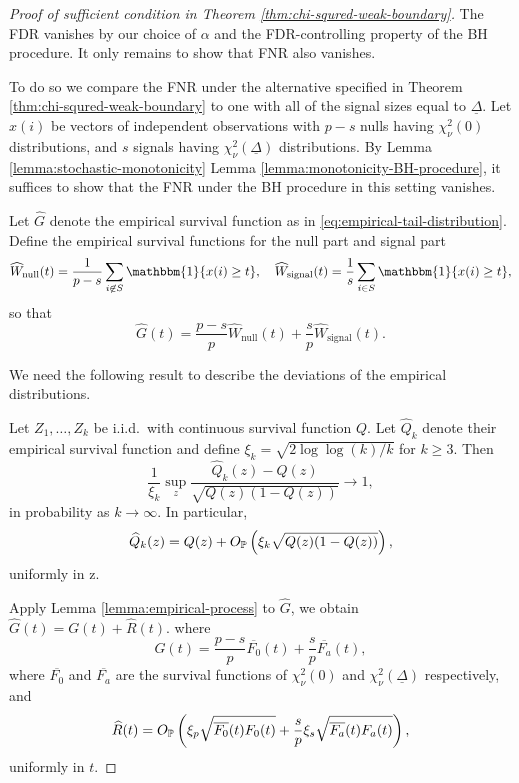 \begin{proof}[Proof of sufficient condition in Theorem \ref{thm:chi-squred-weak-boundary}]
The FDR vanishes by our choice of $\alpha$ and the FDR-controlling property of the BH procedure.
It only remains to show that FNR also vanishes.

To do so we compare the FNR under the alternative specified in Theorem \ref{thm:chi-squred-weak-boundary} to one with all of the signal sizes equal to $\underline{\Delta}$.
Let $x(i)$ be vectors of independent observations with $p-s$ nulls having $\chi^2_\nu(0)$ distributions, and $s$ signals having $\chi^2_\nu(\underline{\Delta})$ distributions.
By Lemma \ref{lemma:stochastic-monotonicity} Lemma \ref{lemma:monotonicity-BH-procedure}, it suffices to show that the FNR under the BH procedure in this setting vanishes.

Let $\widehat{G}$ denote the empirical survival function as in \eqref{eq:empirical-tail-distribution}.
Define the empirical survival functions for the null part and signal part
\begin{equation} \label{eq:empirical-survival-null-signal}
    \widehat{W}_\text{null}(t) = \frac{1}{p-s}\sum_{i\not\in S}\mathbbm{1}\{x(i) \ge t\},
    \quad
    \widehat{W}_\text{signal}(t) = \frac{1}{s}\sum_{i\in S}\mathbbm{1}\{x(i) \ge t\},
\end{equation}
so that
$$
\widehat{G}(t) = \frac{p-s}{p}\widehat{W}_\text{null}(t) + \frac{s}{p}\widehat{W}_\text{signal}(t).
$$

We need the following result to describe the deviations of the empirical distributions.
\begin{lemma} \label{lemma:empirical-process}
Let $Z_1,\ldots,Z_k$ be i.i.d.\ with continuous survival function $Q$.
Let $\widehat{Q}_k$ denote their empirical survival function and define 
$\xi_k = \sqrt{2\log{\log{(k)}}/k}$ for $k \ge 3$. 
Then
$$
\frac{1}{\xi_k}\sup_z\frac{\widehat{Q}_k(z) - Q(z)}{\sqrt{Q(z)(1 - Q(z))}} \to 1,
$$
in probability as $k \to \infty$.
In particular,
$$
\widehat{Q}_k(z) = Q(z) + O_\P\left(\xi_k\sqrt{Q(z)(1 - Q(z))}\right),
$$
uniformly in z.
\end{lemma}

Apply Lemma \ref{lemma:empirical-process} to $\widehat{G}$, we obtain
$\widehat{G}(t) = G(t) + \widehat{R}(t)$.
where 
\begin{equation} \label{eq:empirical-process-mean}
    G(t) = \frac{p-s}{p}\overline{F_0}(t) + \frac{s}{p}\overline{F_a}(t),
\end{equation}
where $\overline{F_0}$ and $\overline{F_{a}}$ are the survival functions of $\chi_\nu^2(0)$ and $\chi_\nu^2(\underline{\Delta})$ respectively, and 
\begin{equation} \label{eq:empirical-process-residual}
    \widehat{R}(t) = O_\P\left(\xi_p\sqrt{\overline{F_0}(t)F_0(t)} + \frac{s}{p}\xi_s\sqrt{\overline{F_a}(t)F_a(t)}\right),
\end{equation}
uniformly in $t$.


\end{proof}
